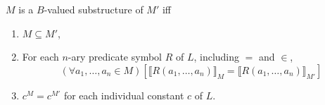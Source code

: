 $M$ is a $B$-valued substructure of $M'$ iff
\begin{enumerate}
\item $M \subseteq M'$,
\item For each $n$-ary predicate symbol $R$ of $L$, including $=$ and $\in$,
  $$(\forall a_1, \ldots, a_n \in M) [\llbracket R(a_1, \ldots, a_n) \rrbracket_M = \llbracket R(a_1, \ldots, a_n) \rrbracket_{M'}]$$
\item $c^M = c^{M'}$ for each individual constant $c$ of $L$.
\end{enumerate}

